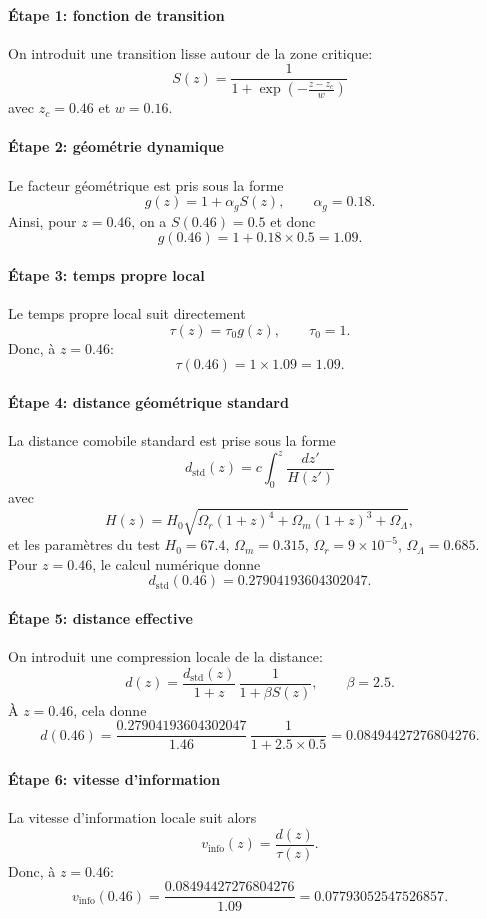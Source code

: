 \paragraph{Étape 1: fonction de transition}
On introduit une transition lisse autour de la zone critique:
\[
S(z)=\frac{1}{1+\exp\!\left(-\frac{z-z_c}{w}\right)}
\]
avec $z_c=0.46$ et $w=0.16$.

\paragraph{Étape 2: géométrie dynamique}
Le facteur géométrique est pris sous la forme
\[
g(z)=1+\alpha_g S(z),
\qquad \alpha_g=0.18.
\]
Ainsi, pour $z=0.46$, on a $S(0.46)=0.5$ et donc
\[
g(0.46)=1+0.18\times 0.5=1.09.
\]

\paragraph{Étape 3: temps propre local}
Le temps propre local suit directement
\[
\tau(z)=\tau_0 g(z),
\qquad \tau_0=1.
\]
Donc, à $z=0.46$:
\[
\tau(0.46)=1\times 1.09=1.09.
\]

\paragraph{Étape 4: distance géométrique standard}
La distance comobile standard est prise sous la forme
\[
d_{\mathrm{std}}(z)=c\int_0^z \frac{dz'}{H(z')}
\]
avec
\[
H(z)=H_0\sqrt{\Omega_r(1+z)^4+\Omega_m(1+z)^3+\Omega_\Lambda},
\]
et les paramètres du test $H_0=67.4$, $\Omega_m=0.315$, $\Omega_r=9\times10^{-5}$, $\Omega_\Lambda=0.685$.
Pour $z=0.46$, le calcul numérique donne
\[
d_{\mathrm{std}}(0.46)=0.27904193604302047.
\]

\paragraph{Étape 5: distance effective}
On introduit une compression locale de la distance:
\[
d(z)=\frac{d_{\mathrm{std}}(z)}{1+z}\,\frac{1}{1+\beta S(z)},
\qquad \beta=2.5.
\]
À $z=0.46$, cela donne
\[
d(0.46)=\frac{0.27904193604302047}{1.46}\,\frac{1}{1+2.5\times 0.5}
=0.08494427276804276.
\]

\paragraph{Étape 6: vitesse d'information}
La vitesse d'information locale suit alors
\[
v_{\mathrm{info}}(z)=\frac{d(z)}{\tau(z)}.
\]
Donc, à $z=0.46$:
\[
v_{\mathrm{info}}(0.46)=\frac{0.08494427276804276}{1.09}=0.07793052547526857.
\]

